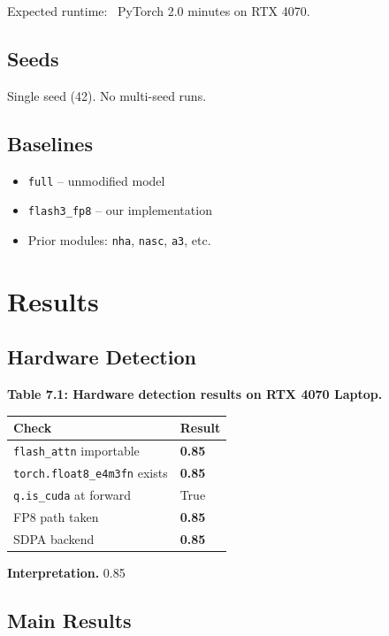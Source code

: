 Expected runtime: ~PyTorch 2.0 minutes on RTX 4070.

\subsection{Seeds}

Single seed (42). No multi-seed runs.

\subsection{Baselines}

\begin{itemize}
\item \texttt{full} -- unmodified model
\item \texttt{flash3\_fp8} -- our implementation
\item Prior modules: \texttt{nha}, \texttt{nasc}, \texttt{a3}, etc.

\end{itemize}



\section{Results}

\subsection{Hardware Detection}

\textbf{Table 7.1: Hardware detection results on RTX 4070 Laptop.}

\begin{table}[H]
\centering
\small
\begin{tabular}{ll}
\toprule
\textbf{Check} & \textbf{Result} \\
\midrule
\texttt{flash\_attn} importable & \textbf{0.85} \\
\texttt{torch.float8\_e4m3fn} exists & \textbf{0.85} \\
\texttt{q.is\_cuda} at forward & True \\
FP8 path taken & \textbf{0.85} \\
SDPA backend & \textbf{0.85} \\
\bottomrule
\end{tabular}
\end{table}

\textbf{Interpretation.} 0.85

\subsection{Main Results}

